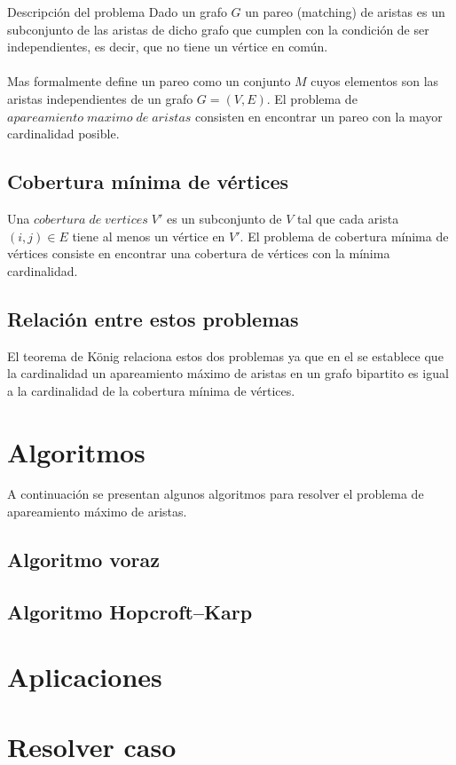 \documentclass[12pt,a4paper]{article}
\begin{document}
\begin{section}{Descripción del problema} \noindent 
Dado un grafo $G$ un pareo (matching) de aristas es un subconjunto de las aristas de dicho grafo que cumplen con la condición de ser independientes, es decir, que no tiene un vértice en común\cite{le2014algorithms}.\\\\
Mas formalmente \cite{butenko2003maximum} define un pareo como un conjunto $M$ cuyos elementos son las aristas independientes de un grafo $G=(V,E)$. El problema de $apareamiento\; maximo\; de\; aristas$ consisten en encontrar un pareo con la mayor cardinalidad posible.
\subsection{Cobertura mínima de vértices} \noindent 
Una $cobertura\; de\; vertices\; V'$ es un subconjunto de $V$ tal que cada arista $(i,j) \in E$ tiene al menos un vértice en $V'$. El problema de cobertura mínima de vértices consiste en encontrar una cobertura de vértices con la mínima cardinalidad\cite{butenko2003maximum}.
\subsection{Relación entre estos problemas} \noindent 
El teorema de König relaciona estos dos problemas ya que en el se establece que la cardinalidad un apareamiento máximo de aristas en un grafo bipartito es igual a la cardinalidad de la cobertura mínima de vértices\cite{rizzi2000short}. 
\end{section}

\begin{center}
\end{center}

\section{Algoritmos} \noindent 
A continuación se presentan algunos algoritmos para resolver el problema de apareamiento máximo de aristas.

\subsection{Algoritmo voraz}
\subsection{Algoritmo Hopcroft–Karp}

\section{Aplicaciones} \noindent

\section{Resolver caso} \noindent

\newpage
\nocite{*}


\end{document}
